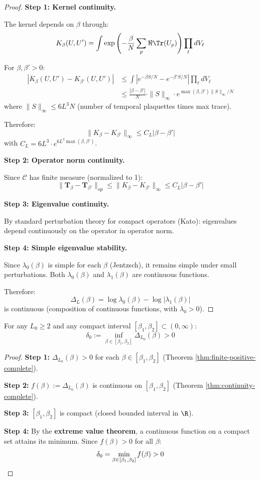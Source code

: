 \begin{proof}
\textbf{Step 1: Kernel continuity.}

The kernel depends on $\beta$ through:
\[
K_\beta(U, U') = \int \exp\left(-\frac{\beta}{N} \sum_p \Re\Tr(U_p)\right) \prod_\ell dV_\ell
\]

For $\beta, \beta' > 0$:
\begin{align*}
|K_\beta(U, U') - K_{\beta'}(U, U')| &\leq \int \left|e^{-\beta S/N} - e^{-\beta' S/N}\right| \prod_\ell dV_\ell \\
&\leq \frac{|\beta - \beta'|}{N} \cdot \|S\|_\infty \cdot e^{\max(\beta, \beta') \|S\|_\infty/N}
\end{align*}
where $\|S\|_\infty \leq 6L^3 N$ (number of temporal plaquettes times max trace).

Therefore:
\[
\|K_\beta - K_{\beta'}\|_\infty \leq C_L |\beta - \beta'|
\]
with $C_L = 6L^3 \cdot e^{6L^3 \max(\beta, \beta')}$.

\textbf{Step 2: Operator norm continuity.}

Since $\mathcal{C}$ has finite measure (normalized to 1):
\[
\|\mathbf{T}_\beta - \mathbf{T}_{\beta'}\|_{op} \leq \|K_\beta - K_{\beta'}\|_\infty \leq C_L |\beta - \beta'|
\]

\textbf{Step 3: Eigenvalue continuity.}

By standard perturbation theory for compact operators (Kato):
eigenvalues depend continuously on the operator in operator norm.

\textbf{Step 4: Simple eigenvalue stability.}

Since $\lambda_0(\beta)$ is simple for each $\beta$ (Jentzsch), it remains simple 
under small perturbations. Both $\lambda_0(\beta)$ and $\lambda_1(\beta)$ are 
continuous functions.

Therefore:
\[
\Delta_L(\beta) = \log\lambda_0(\beta) - \log|\lambda_1(\beta)|
\]
is continuous (composition of continuous functions, with $\lambda_0 > 0$).
\end{proof}

\begin{theorem}
\label{thm:uniform-lower-complete}
For any $L_0 \geq 2$ and any compact interval $[\beta_1, \beta_2] \subset (0, \infty)$:
\[
\delta_0 := \inf_{\beta \in [\beta_1, \beta_2]} \Delta_{L_0}(\beta) > 0
\]
\end{theorem}

\begin{proof}
\textbf{Step 1:} $\Delta_{L_0}(\beta) > 0$ for each $\beta \in [\beta_1, \beta_2]$ 
(Theorem \ref{thm:finite-positive-complete}).

\textbf{Step 2:} $f(\beta) := \Delta_{L_0}(\beta)$ is continuous on $[\beta_1, \beta_2]$ 
(Theorem \ref{thm:continuity-complete}).

\textbf{Step 3:} $[\beta_1, \beta_2]$ is compact (closed bounded interval in $\R$).

\textbf{Step 4:} By the \textbf{extreme value theorem}, a continuous function on a 
compact set attains its minimum. Since $f(\beta) > 0$ for all $\beta$:
\[
\delta_0 = \min_{\beta \in [\beta_1, \beta_2]} f(\beta) > 0 \qedhere
\]
\end{proof}

